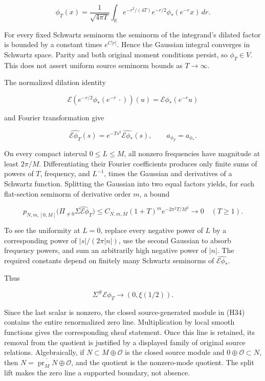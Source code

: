 \[
\phi_T(x)=\frac1{\sqrt{4\pi T}}\int_{\mathbb R}
 e^{-r^2/(4T)}e^{-r/2}\phi_*(e^{-r}x)\,dr.
\tag{H38}
\]

For every fixed Schwartz seminorm the seminorm of the integrand's dilated factor is bounded by a constant times \(e^{C|r|}\). Hence the Gaussian integral converges in Schwartz space. Parity and both original moment conditions persist, so \(\phi_T\in V\). This does not assert uniform source seminorm bounds as \(T\to\infty\).

The normalized dilation identity

\[
\mathcal E(e^{-r/2}\phi_*(e^{-r}\,\cdot))(u)=\mathcal E\phi_*(e^{-r}u)
\]

and Fourier transformation give

\[
\widehat{\mathcal E\phi_T}(s)=e^{-Ts^2}\widehat{\mathcal E\phi_*}(s),\qquad
a_{\phi_T}=a_{\phi_*}.
\tag{H39}
\]

On every compact interval \(0\le L\le M\), all nonzero frequencies have magnitude at least \(2\pi/M\). Differentiating their Fourier coefficients produces only finite sums of powers of \(T\), frequency, and \(L^{-1}\), times the Gaussian and derivatives of a Schwartz function. Splitting the Gaussian into two equal factors yields, for each flat-section seminorm of derivative order \(m\), a bound

\[
p_{N,m,[0,M]}\bigl(\Pi_{\ne0}\widehat{\Sigma\mathcal E\phi_T}\bigr)
\le C_{N,m,M}(1+T)^m e^{-2\pi^2T/M^2}\longrightarrow0
\quad(T\ge1).
\tag{H40}
\]

To see the uniformity at \(L=0\), replace every negative power of \(L\) by a corresponding power of \(|s|/(2\pi|n|)\), use the second Gaussian to absorb frequency powers, and sum an arbitrarily high negative power of \(|n|\). The required constants depend on finitely many Schwartz seminorms of \(\widehat{\mathcal E\phi_*}\).

Thus

\[
\Sigma^\#\mathcal E\phi_T\longrightarrow(0,\xi(1/2)).
\tag{H41}
\]

Since the last scalar is nonzero, the closed source-generated module in (H34) contains the entire renormalized zero line. Multiplication by local smooth functions gives the corresponding sheaf statement. Once this line is retained, its removal from the quotient is justified by a displayed family of original source relations. Algebraically, if \(N\subset M\oplus\mathcal O\) is the closed source module and \(0\oplus\mathcal O\subset N\), then \(N=\overline{\operatorname{pr}_M N}\oplus\mathcal O\), and the quotient is the nonzero-mode quotient. The split lift makes the zero line a supported boundary, not absence.

